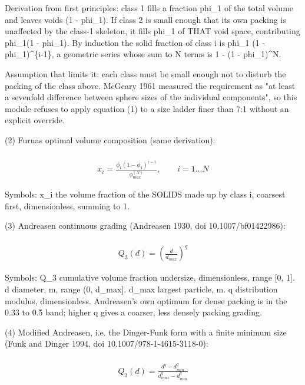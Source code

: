 \documentclass[10pt,a4paper,twoside]{report}
\begin{document}
Derivation from first principles: class 1 fills a fraction phi\_1 of the total volume and leaves voids (1 - phi\_1). If class 2 is small enough that its own packing is unaffected by the class-1 skeleton, it fills phi\_1 of THAT void space, contributing phi\_1(1 - phi\_1). By induction the solid fraction of class i is phi\_1 (1 - phi\_1)\textasciicircum{}\{i-1\}, a geometric series whose sum to N terms is 1 - (1 - phi\_1)\textasciicircum{}N.

Assumption that limits it: each class must be small enough not to disturb the packing of the class above. McGeary 1961 measured the requirement as "at least a sevenfold difference between sphere sizes of the individual components", so this module refuses to apply equation (1) to a size ladder finer than 7:1 without an explicit override.

(2) Furnas optimal volume composition (same derivation):

\begin{equation*}
\begin{gathered}
\\ x_i = \frac{\phi_1 (1 - \phi_1)^{i-1}}{\phi_{max}^{(N)}}, \qquad i = 1 \ldots N
\end{gathered}
\end{equation*}

Symbols: x\_i the volume fraction of the SOLIDS made up by class i, coarsest first, dimensionless, summing to 1.

(3) Andreasen continuous grading (Andreasen 1930, doi 10.1007/bf01422986):

\begin{equation*}
\begin{gathered}
\\ Q_3(d) = \left(\frac{d}{d_{max}}\right)^{q}
\end{gathered}
\end{equation*}

Symbols: Q\_3     cumulative volume fraction undersize, dimensionless, range [0, 1]. d       diameter, m, range (0, d\_max]. d\_max   largest particle, m. q       distribution modulus, dimensionless. Andreasen's own optimum for dense packing is in the 0.33 to 0.5 band; higher q gives a coarser, less densely packing grading.

(4) Modified Andreasen, i.e. the Dinger-Funk form with a finite minimum size (Funk and Dinger 1994, doi 10.1007/978-1-4615-3118-0):

\begin{equation*}
\begin{gathered}
\\ Q_3(d) = \frac{d^{q} - d_{min}^{q}}{d_{max}^{q} - d_{min}^{q}}
\end{gathered}
\end{equation*}
\end{document}
